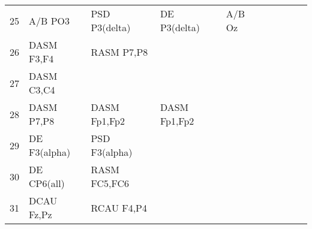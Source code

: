 \begin{landscape}
\begin{table}[]
\begin{tabular}{l|llllllll}
25       & A/B PO3               & PSD P3(delta)         & DE P3(delta)         & A/B Oz                  &                         &                      &                      &                       &                       &                    \\
26       & DASM F3,F4            & RASM P7,P8            &                      &                         &                         &                      &                      &                       &                       &                    \\
27       & DASM C3,C4            &                       &                      &                         &                         &                      &                      &                       &                       &                    \\
28       & DASM P7,P8            & DASM Fp1,Fp2          & DASM Fp1,Fp2         &                         &                         &                      &                      &                       &                       &                    \\
29       & DE F3(alpha)          & PSD F3(alpha)         &                      &                         &                         &                      &                      &                       &                       &                    \\
30       & DE CP6(all)           & RASM FC5,FC6          &                      &                         &                         &                      &                      &                       &                       &                    \\
31       & DCAU Fz,Pz            & RCAU F4,P4            &                      &                         &                         &                      &                      &                       &                       &                    \\
\end{tabular}
\end{table}
\end{landscape}
\clearpage
